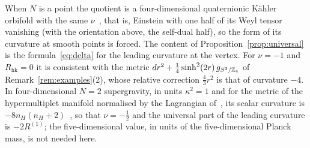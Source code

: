 When $N$ is a point the quotient is a four-dimensional quaternionic K\"ahler orbifold with the same
$\nu$~\cite{Galicki:1988}, that is, Einstein with one half of its Weyl tensor vanishing (with the
orientation above, the self-dual half), so the form of its curvature at smooth points is forced. The
content of Proposition~\ref{prop:universal} is the formula~\eqref{eq:delta} for the leading curvature at
the vertex. For $\nu=-1$ and $R_{\mathrm{hk}}=0$ it is consistent with the metric
$dr^2+\tfrac14\sinh^2(2r)\,g_{S^3/\mathbb Z_4}$ of Remark~\ref{rem:examples}(2), whose relative correction
$\tfrac43r^2$ is that of curvature $-4$. In four-dimensional $N=2$ supergravity, in units $\kappa^2=1$ and
for the metric of the hypermultiplet manifold normalised by the Lagrangian of~\cite{Hristov:2009}, its
scalar curvature is $-8n_H(n_H+2)$~\cite[eq.~(2.3)]{Hristov:2009}, so that $\nu=-\tfrac12$ and the universal
part of the leading curvature is $-2R^{(1)}$; the five-dimensional value, in units of the
five-dimensional Planck mass, is not needed here.
